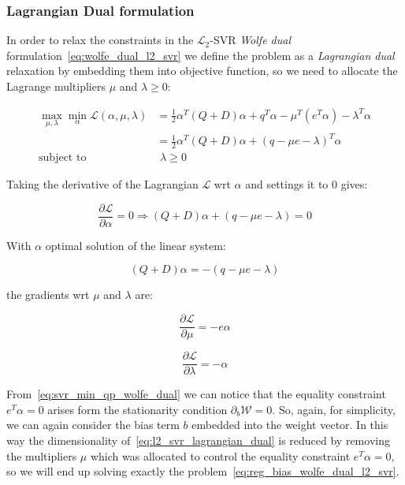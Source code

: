 \subsubsection{Lagrangian Dual formulation}

In order to relax the constraints in the $\mathcal{L}_2$-SVR \emph{Wolfe dual} formulation~\eqref{eq:wolfe_dual_l2_svr} we define the problem as a \emph{Lagrangian dual} relaxation by embedding them into objective function, so we need to allocate the Lagrange multipliers $\mu$ and $\lambda \geq 0$:

\begin{equation} \label{eq:l2_svr_lagrangian_dual}
	\begin{aligned}
		    \max_{\mu,\lambda} \min_{\alpha} \mathcal{L}(\alpha,\mu,\lambda) &= \frac{1}{2} \alpha^T (Q+D)\alpha+q^T\alpha - \mu^T (e^T \alpha) - \lambda^T \alpha \\
    &= \frac{1}{2} \alpha^T (Q+D)\alpha + (q - \mu e - \lambda)^T \alpha \\
    \text{subject to} \quad & \,\, \lambda \geq 0
	\end{aligned}
\end{equation}

Taking the derivative of the Lagrangian $\mathcal{L}$ wrt $\alpha$ and settings it to 0 gives:

\begin{equation} \label{eq:l2_svr_lagrangian_der_a}
	\frac{\partial \mathcal{L}}{\partial \alpha}=0\Rightarrow (Q+D) \alpha + (q - \mu e - \lambda) = 0
\end{equation}

With $\alpha$ optimal solution of the linear system:

\begin{equation} \label{eq:l2_svr_lagrangian_sol}
    (Q+D) \alpha = - (q - \mu e - \lambda)
\end{equation}

the gradients wrt $\mu$ and $\lambda$ are:

\begin{equation} \label{eq:l2_svr_lagrangian_der_mu}
	\frac{\partial \mathcal{L}}{\partial \mu}=-e \alpha
\end{equation}

\begin{equation} \label{eq:l2_svr_lagrangian_der_lalbda}
    \frac{\partial \mathcal{L}}{\partial \lambda}=-\alpha
\end{equation}

From~\eqref{eq:svr_min_qp_wolfe_dual} we can notice that the equality constraint $e^T \alpha = 0$ arises form the stationarity condition $\partial_{{b}} \mathcal{W}=0$. So, again, for simplicity, we can again consider the bias term $b$ embedded into the weight vector. In this way the dimensionality of~\eqref{eq:l2_svr_lagrangian_dual} is reduced by removing the multipliers $\mu$ which was allocated to control the equality constraint $e^T \alpha=0$, so we will end up solving exactly the problem~\eqref{eq:reg_bias_wolfe_dual_l2_svr}.

